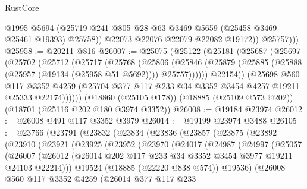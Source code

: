 \begin{lexlean}{RustCore}
\begin{coremodule}
                @1995
                @5694
                (@25719 @241 @805 @28 @63 @3469 @5659 (@25458 @3469 @25461 @19393) @25758))
              @22073
              @22076
              @22079
              @22082
              @19172))
          @25757)))
@25958 := @20211 @816
@26007 := @25075
    (@25122
      (@25181
        (@25687
          (@25697
            (@25702
              (@25712
                (@25717
                  (@25768
                    (@25806
                      (@25846
                        (@25879 (@25885 (@25888 (@25957 (@19134 (@25958 @51 @5692)))) @25757))))))
                @22154))
            (@25698
              @560
              @117
              @3352
              @4259
              (@25704 @377 @117 @233 @34 @3352 @3454 @4257 @19211 @25333 @22174))))))
    (@18860 (@25105 @178))
    (@18885 (@25109 @573 @202))
    (@18701 (@25116 @202 @180 @3974 @3352))
@26008 := @19184 @23974
@26012 := @26008 @491 @117 @3352 @3979
@26014 := @19199 @23974 @3488
@26105 := @23766
    (@23791
      (@23832
        (@23834
          (@23836
            (@23857
              (@23875
                (@23892
                  (@23910
                    (@23921
                      (@23925
                        (@23952
                          (@23970
                            (@24017
                              (@24987
                                (@24997
                                  (@25057
                                    (@26007
                                      (@26012
                                        (@26014
                                          @202
                                          @117
                                          @233
                                          @34
                                          @3352
                                          @3454
                                          @3977
                                          @19211
                                          @24103
                                          @22214)))
                                    @19524
                                    (@18885 (@22220 @838 @574))
                                    @19536)
                                  (@26008
                                    @560
                                    @117
                                    @3352
                                    @4259
                                    (@26014
                                      @377
                                      @117
                                      @233

\end{coremodule}
\end{lexlean}

